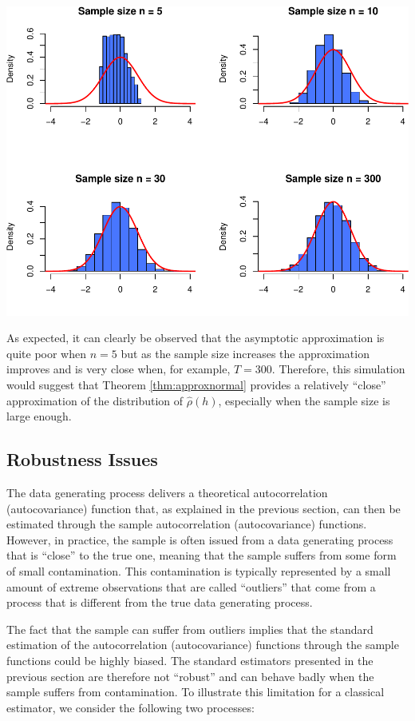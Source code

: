 \documentclass[]{book}
\theoremstyle{definition}
\theoremstyle{definition}
\theoremstyle{definition}
\theoremstyle{remark}
\begin{document}
\includegraphics{ts_files/figure-latex/simulationACF-1.pdf}

As expected, it can clearly be observed that the asymptotic
approximation is quite poor when \(n = 5\) but as the sample size
increases the approximation improves and is very close when, for
example, \(T = 300\). Therefore, this simulation would suggest that
Theorem \ref{thm:approxnormal} provides a relatively ``close''
approximation of the distribution of \(\hat{\rho}(h)\), especially when
the sample size is large enough.

\subsection{Robustness Issues}\label{robustness-issues}

The data generating process delivers a theoretical autocorrelation
(autocovariance) function that, as explained in the previous section,
can then be estimated through the sample autocorrelation
(autocovariance) functions. However, in practice, the sample is often
issued from a data generating process that is ``close'' to the true one,
meaning that the sample suffers from some form of small contamination.
This contamination is typically represented by a small amount of extreme
observations that are called ``outliers'' that come from a process that
is different from the true data generating process.

The fact that the sample can suffer from outliers implies that the
standard estimation of the autocorrelation (autocovariance) functions
through the sample functions could be highly biased. The standard
estimators presented in the previous section are therefore not
``robust'' and can behave badly when the sample suffers from
contamination. To illustrate this limitation for a classical estimator,
we consider the following two processes:
\end{document}
